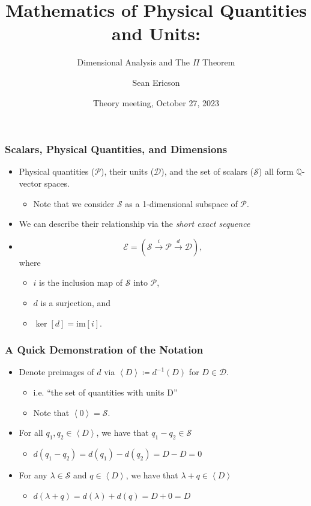 \documentclass{beamer}
\title{Mathematics of Physical Quantities and Units:}
\subtitle{Dimensional Analysis and The $\Pi$ Theorem}
\author{Sean Ericson}
\institute{UO}
\date{Theory meeting, October 27, 2023}
\newcommand{\avg}[1]{\left<#1\right>}
\begin{document}
\frame{\titlepage}

\begin{frame}
\frametitle{Scalars, Physical Quantities, and Dimensions}
\begin{itemize}
    \item<1-> Physical quantities ($\mathcal{P}$), their units ($\mathcal{D}$), and the set of scalars ($\mathcal{S}$) all form $\mathbb{Q}$-vector spaces.
    \begin{itemize}
        \item<2-> Note that we consider $\mathcal{S}$ as a 1-dimensional subspace of $\mathcal{P}$.
    \end{itemize}
    \item<3-> We can describe their relationship via the \textit{short exact sequence}
    \item<4-> \[ \mathcal{E} = \left( \mathcal{S} \xrightarrow{i} \mathcal{P} \xrightarrow{d} \mathcal{D} \right), \] where
    \begin{itemize}
        \item<5-> $i$ is the inclusion map of $\mathcal{S}$ into $\mathcal{P}$,
        \item<6-> $d$ is a surjection, and
        \item<7-> $\ker[d] = \text{im}[i]$.
    \end{itemize}
\end{itemize}
\end{frame}

\begin{frame}
\frametitle{A Quick Demonstration of the Notation}
    \begin{itemize}
        \item<1-> Denote preimages of $d$ via $\avg{D} \coloneqq d^{-1}(D)$ for $D \in \mathcal{D}$.
        \begin{itemize}
            \item<2-> i.e. ``the set of quantities with units D''
            \item<3-> Note that $\avg{0} = \mathcal{S}$.
        \end{itemize}
        \item<4-> For all $q_1, q_2 \in \avg{D}$, we have that $q_1 - q_2 \in \mathcal{S}$
        \begin{itemize}
            \item<5-> $d(q_1 - q_2) = d(q_1) - d(q_2) = D - D = 0$
        \end{itemize}
        \item<6-> For any $\lambda \in \mathcal{S}$ and $q \in \avg{D}$, we have that $\lambda + q \in \avg{D}$
        \begin{itemize}
            \item<7-> $d(\lambda + q) = d(\lambda) + d(q) = D + 0 = D$
        \end{itemize}
    \end{itemize}
\end{frame}
\end{document}
